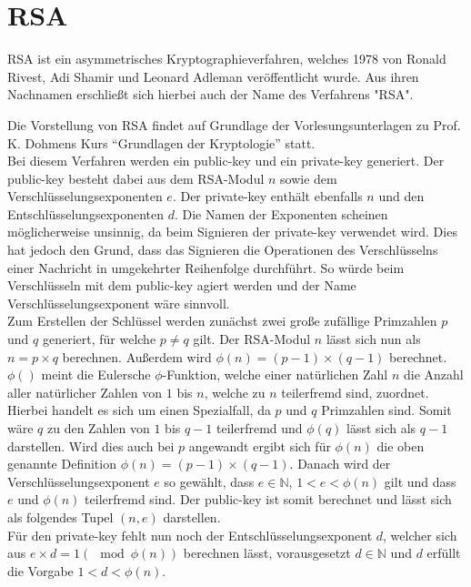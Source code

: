 \documentclass[thesis=bachelor,faculty=cb]{hsmw-thesis}
\begin{document}
\section{RSA}
RSA ist ein asymmetrisches Kryptographieverfahren, welches 1978 von Ronald Rivest, Adi Shamir und Leonard Adleman veröffentlicht wurde. Aus ihren Nachnamen erschließt sich hierbei auch der Name des Verfahrens "RSA". 

Die Vorstellung von RSA findet auf Grundlage der Vorlesungsunterlagen \cite{RSA} zu Prof. K. Dohmens Kurs \enquote{Grundlagen der Kryptologie} statt.  
\\[1cm]
Bei diesem Verfahren werden ein public-key und ein private-key generiert. Der public-key besteht dabei aus dem RSA-Modul $n$ sowie dem Verschlüsselungsexponenten $e$. Der private-key enthält ebenfalls $n$ und den Entschlüsselungsexponenten $d$.
Die Namen der Exponenten scheinen möglicherweise unsinnig, da beim Signieren der private-key verwendet wird. Dies hat jedoch den Grund, dass das Signieren die Operationen des Verschlüsselns einer Nachricht in umgekehrter Reihenfolge durchführt. So würde beim Verschlüsseln mit dem public-key agiert werden und der Name Verschlüsselungsexponent wäre sinnvoll.
\\[1cm]
Zum Erstellen der Schlüssel werden zunächst zwei große zufällige Primzahlen $p$ und $q$ generiert, für welche $p \neq q$ gilt. Der RSA-Modul $n$ lässt sich nun als $n = p \times q$ berechnen. Außerdem wird \begin{math}\phi(n) = (p-1)\times(q-1) \end{math} berechnet.
$\phi()$ meint die Eulersche $\phi$-Funktion, welche einer natürlichen Zahl $n$ die Anzahl aller natürlicher Zahlen von $1$ bis $n$, welche zu $n$ teilerfremd sind, zuordnet. Hierbei handelt es sich um einen Spezialfall, da $p$ und $q$ Primzahlen sind. Somit wäre $q$ zu den Zahlen von $1$ bis $q-1$ teilerfremd und $\phi(q)$
lässt sich als $q-1$ darstellen. Wird dies auch bei $p$ angewandt ergibt sich für $\phi(n)$ die oben genannte Definition $\phi(n) = (p-1) \times (q-1)$. Danach wird der Verschlüsselungsexponent $e$ so gewählt, dass $e \in \mathbb{N}$, $1 < e < \phi(n)$ gilt und dass $e$ und $\phi(n)$ teilerfremd
sind. Der public-key ist somit berechnet und lässt sich als folgendes Tupel $(n, e)$ darstellen. 
\\[1cm]
Für den private-key fehlt nun noch der Entschlüsselungsexponent $d$, welcher sich aus $e \times d = 1 ( \mod \phi(n))$ berechnen lässt, vorausgesetzt $d \in \mathbb{N}$ und $d$ erfüllt die Vorgabe $1 < d < \phi(n)$.
\end{document}
